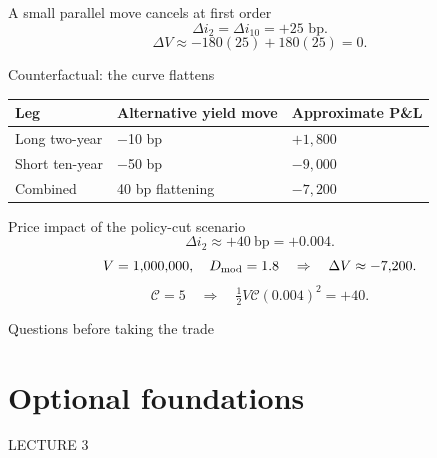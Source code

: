 \documentclass[12pt,aspectratio=169]{beamer}
\begin{document}

\begin{frame}{A small parallel move cancels at first order}
\[\Delta i_2=\Delta i_{10}=+25\text{ bp}.\]\[\Delta V\approx-180(25)+180(25)=0.\]
\end{frame}


\begin{frame}{Counterfactual: the curve flattens}
\begin{center}\begin{tabular}{@{}lll@{}}\toprule \textbf{Leg} & \textbf{Alternative yield move} & \textbf{Approximate P\&L}\\\midrule Long two-year & $-$10 bp & $+1{,}800$\\[2mm]
Short ten-year & $-$50 bp & $-9{,}000$\\[2mm]
Combined & 40 bp flattening & $-7{,}200$\\\bottomrule\end{tabular}\end{center}
\end{frame}


\begin{frame}{Price impact of the policy-cut scenario}
\[\Delta i_2\approx+40\mathrm{\ bp}=+0.004.\]\[V=1{,}000{,}000,\quad D_{\rm mod}=1.8\quad\Rightarrow\quad\Delta V\approx-7{,}200.\]\[\mathcal C=5\quad\Rightarrow\quad\tfrac12 V\mathcal C(0.004)^2=+40.\]
\end{frame}


\begin{frame}{Questions before taking the trade}
\end{frame}

\section[Optional foundations]{Optional foundations}
\begin{frame}[plain]
{\color{Gold}\large LECTURE 3}\par\vspace{9mm}{\Huge\bfseries Optional foundations}\par\vspace{7mm}{\Large How do dates, states and compounding fit one pricing framework?}
\end{frame}
\end{document}
